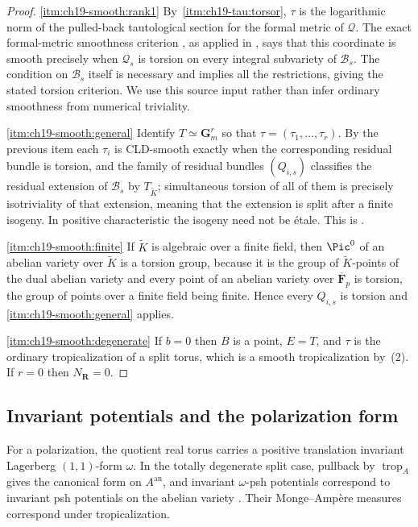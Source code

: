 \begin{proof}
\cref{itm:ch19-smooth:rank1} By
\,\cref{itm:ch19-tau:torsor}, $\tau$ is the
logarithmic norm of the pulled-back tautological section for the formal
metric of $\mathcal Q$.  The exact formal-metric smoothness criterion
\cite[Proposition~17.4.13]{CLD25}, as applied in
\cite[Remark~19.2.3]{CLD25}, says that this coordinate is smooth precisely
when $\mathcal Q_s$ is torsion on every integral subvariety of
$\mathcal B_s$.  The condition on $\mathcal B_s$ itself is necessary and
implies all the restrictions, giving the stated torsion criterion.  We use
this source input rather than infer ordinary smoothness from numerical
triviality.

\cref{itm:ch19-smooth:general} Identify $T\simeq\mathbf G_m^r$ so that
$\tau=(\tau_1,\ldots,\tau_r)$.  By the previous item each $\tau_i$ is
CLD-smooth exactly when the corresponding residual bundle is torsion, and
the family of residual bundles $(Q_{i,s})$ classifies the residual extension
of $\mathcal B_s$ by $T_{\widetilde K}$; simultaneous torsion of all of them
is precisely isotriviality of that extension, meaning that the extension is
split after a finite isogeny.  In positive characteristic the isogeny
need not be \'etale.  This is
\cite[Remark~19.2.3]{CLD25}.

\cref{itm:ch19-smooth:finite} If $\widetilde K$ is algebraic over a finite
field, then $\Pic^0$ of an abelian variety over $\widetilde K$ is a torsion
group, because it is the group of $\widetilde K$-points of the dual abelian
variety and every point of an abelian variety over $\overline{\mathbf F}_p$
is torsion, the group of points over a finite field being finite.  Hence
every $Q_{i,s}$ is torsion and \cref{itm:ch19-smooth:general} applies.

\cref{itm:ch19-smooth:degenerate} If $b=0$ then $B$ is a point, $E=T$, and
$\tau$ is the ordinary tropicalization of a split torus, which is a smooth
tropicalization by \,(2).  If $r=0$ then
$N_{\mathbf R}=0$.
\end{proof}

\subsection{Invariant potentials and the polarization form}
\label{sec:ch19-abelian-invariant}

For a polarization, the quotient real torus carries a positive translation
invariant Lagerberg $(1,1)$-form $\omega$.  In the totally degenerate
split case, pullback by $\operatorname{trop}_A$ gives the canonical form on
$A^{\mathrm{an}}$, and invariant $\omega$-psh potentials correspond to
invariant psh potentials on the abelian variety
\cite[Proposition~7.4.5]{BGJKK25}.  Their Monge--Amp\`ere measures correspond
under tropicalization.

